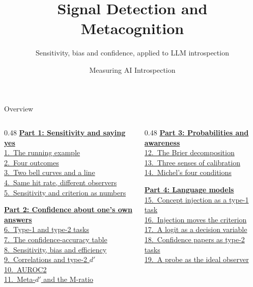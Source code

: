 \documentclass[aspectratio=169,11pt]{beamer}
\title{Signal Detection and Metacognition}
\subtitle{Sensitivity, bias and confidence, applied to LLM introspection}
\author{Measuring AI Introspection}
\date{}
\institute{}
\begin{document}
\maketitle

\begin{frame}{Overview}\footnotesize
\begin{columns}[T]
\begin{column}{0.48\textwidth}
\hyperlink{part1}{\textbf{Part 1: Sensitivity and saying yes}}\\[0.15em]
{\scriptsize%
\quad\hyperlink{running}{1.~The running example}\\%
\quad\hyperlink{fourout}{2.~Four outcomes}\\%
\quad\hyperlink{curves}{3.~Two bell curves and a line}\\%
\quad\hyperlink{samehit}{4.~Same hit rate, different observers}\\%
\quad\hyperlink{formulas}{5.~Sensitivity and criterion as numbers}%
}\vspace{0.15em}

\hyperlink{part2}{\textbf{Part 2: Confidence about one's own answers}}\\[0.15em]
{\scriptsize%
\quad\hyperlink{types}{6.~Type-1 and type-2 tasks}\\%
\quad\hyperlink{table2}{7.~The confidence-accuracy table}\\%
\quad\hyperlink{three}{8.~Sensitivity, bias and efficiency}\\%
\quad\hyperlink{fail}{9.~Correlations and type-2 $d'$}\\%
\quad\hyperlink{auroc}{10.~AUROC2}\\%
\quad\hyperlink{metad}{11.~Meta-$d'$ and the M-ratio}%
}
\end{column}
\begin{column}{0.48\textwidth}
\hyperlink{part3}{\textbf{Part 3: Probabilities and awareness}}\\[0.15em]
{\scriptsize%
\quad\hyperlink{brier}{12.~The Brier decomposition}\\%
\quad\hyperlink{calsenses}{13.~Three senses of calibration}\\%
\quad\hyperlink{michel}{14.~Michel's four conditions}%
}\vspace{0.15em}

\hyperlink{part4}{\textbf{Part 4: Language models}}\\[0.15em]
{\scriptsize%
\quad\hyperlink{injection}{15.~Concept injection as a type-1 task}\\%
\quad\hyperlink{hahami}{16.~Injection moves the criterion}\\%
\quad\hyperlink{logit}{17.~A logit as a decision variable}\\%
\quad\hyperlink{conftasks}{18.~Confidence papers as type-2 tasks}\\%
\quad\hyperlink{probe}{19.~A probe as the ideal observer}%
}\vspace{0.15em}


\end{column}
\end{columns}
\end{frame}
\end{document}
